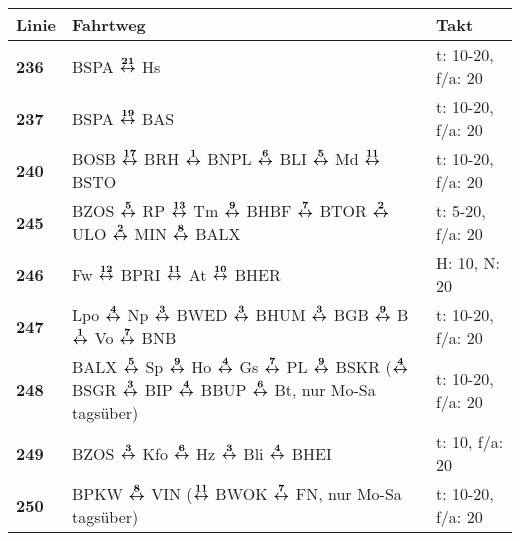 \begin{minipage}[t]{0.45\textwidth}
\begin{tabular}{>{\bfseries}L{1.2cm}L{9.0cm}L{3.0cm}}
{\bfseries Linie} & {\bfseries Fahrtweg} & {\bfseries Takt} \\
\hline
\bus{} 236    & BSPA $\xarwe{21}$ Hs                                                                                                                                                & t: 10-20, f/a: 20          \\
\bus{} 237    & BSPA $\xarwe{19}$ BAS                                                                                                                                               & t: 10-20, f/a: 20          \\
\bus{} 240    & BOSB $\xarwe{17}$ BRH $\xarwe{1}$ BNPL $\xarwe{6}$ BLI $\xarwe{5}$ Md $\xarwe{11}$ BSTO                                                                             & t: 10-20, f/a: 20          \\
\bus{} 245    & BZOS $\xarwe{5}$ RP $\xarwe{13}$ Tm $\xarwe{9}$ BHBF $\xarwe{7}$ BTOR $\xarwe{2}$ ULO $\xarwe{2}$ MIN $\xarwe{8}$ BALX                                              & t: 5-20, f/a: 20           \\
\bus{} 246    & Fw $\xarwe{12}$ BPRI $\xarwe{11}$ At $\xarwe{10}$ BHER                                                                                                              & H: 10, N: 20               \\
\bus{} 247    & Lpo $\xarwe{4}$ Np $\xarwe{3}$ BWED $\xarwe{3}$ BHUM $\xarwe{3}$ BGB $\xarwe{9}$ B $\xarwe{1}$ Vo $\xarwe{7}$ BNB                                                   & t: 10-20, f/a: 20          \\
\bus{} 248    & BALX $\xarwe{5}$ Sp $\xarwe{9}$ Ho $\xarwe{4}$ Gs $\xarwe{7}$ PL $\xarwe{9}$ BSKR ($\xarwe{4}$ BSGR $\xarwe{3}$ BIP $\xarwe{4}$ BBUP $\xarwe{6}$ Bt, %
                nur Mo-Sa tagsüber)                                                                                                                                                 & t: 10-20, f/a: 20          \\
\bus{} 249    & BZOS $\xarwe{3}$ Kfo $\xarwe{6}$ Hz $\xarwe{3}$ Bli $\xarwe{4}$ BHEI                                                                                                & t: 10, f/a: 20             \\
\bus{} 250    & BPKW $\xarwe{8}$ VIN ($\xarwe{11}$ BWOK $\xarwe{7}$ FN, nur Mo-Sa tagsüber)                                                                                         & t: 10-20, f/a: 20          \\

\end{tabular}
\end{minipage}
